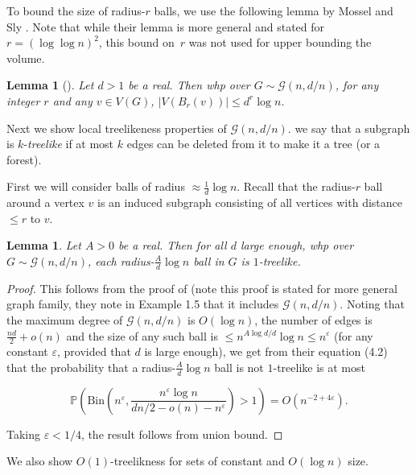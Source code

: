 \documentclass[11pt]{article}
\theoremstyle{plain}
\newtheorem{lemma}[theorem]{Lemma}
\let\epsilon=\varepsilon
\newcommand{\G}{\mathcal{G}}
\renewcommand{\P}{\mathds{P}}
\newcommand{\1}{\mathbb{1}}
\newcommand{\Bin}{\text{Bin}}
\begin{document}
To bound the size of radius-\(r\) balls, we use the following lemma by Mossel and Sly \cite{MosselSly}. Note that while their lemma is more general and stated for \(r = (\log\log n)^2\), this bound on~$r$ was not used for upper bounding the volume.

\begin{lemma}[{\cite[Lemma 7]{MosselSly}}]\label{lem:ball-size}
    Let \(d > 1\) be a real. Then whp over \(G\sim\G(n,d/n)\), for any integer \(r\) and any \(v\in V(G)\), \(|V(B_r(v))|\leq d^r \log n\).
\end{lemma}

Next we show local treelikeness properties of \(\G(n,d/n)\).
we say that a subgraph is \(k\)-\textit{treelike} if at most \(k\) edges can be deleted from it to make it a tree (or a forest).

First we will consider balls of radius \(\approx \tfrac 1d \log n\). Recall that the radius-\(r\) ball around a vertex \(v\) is an induced subgraph consisting of all vertices with distance \(\leq r\) to \(v\).

\begin{lemma}\label{lem:G-1-treelike}
    Let \(A>0\) be a real. Then for all \(d\) large enough, whp over \(G\sim\G(n, d/n)\), each radius-\(\tfrac Ad\log n\) ball in \(G\) is \(1\)-treelike.
\end{lemma}
\begin{proof}
    This follows from the proof of \cite[(4.2)]{rcm-on-unbounded-degree-graphs} (note this proof is stated for more general graph family, they note in Example 1.5 that it includes \(\G(n,d/n)\). Noting that the maximum degree of \(\G(n,d/n)\) is \(O(\log n)\), the number of edges is \(\tfrac{nd}2+o(n)\) and the size of any such ball is \(\leq n^{A\log d/d}\log n\leq n^{\epsilon}\) (for any constant \(\epsilon\), provided that \(d\) is large enough), we get from their equation (4.2) that the probability that a radius-\(\frac{A}{d}\log n\) ball is not \(1\)-treelike is at most

    \[
    \P\left(\Bin\left(n^{\epsilon}, \frac{n^\epsilon \log n }{dn/2 - o(n)-n^\epsilon}\right) > 1\right) = O(n^{-2+4\epsilon}).
    \]

    Taking \(\epsilon < 1/4\), the result follows from union bound.
\end{proof}

We also show \(O(1)\)-treelikness for sets of constant and \(O(\log n)\) size.
\end{document}
